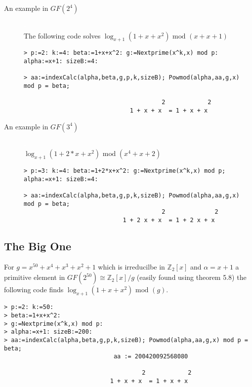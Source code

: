 \documentclass[article,oneside]{memoir}
\newcommand{\blank}{\textcolor{white}{-}}
\begin{document}
\begin{description}
\item[An example in $GF(2^4)$]  \blank \\
The following code solves
$\log_{x+1} (1+x+x^2) \textrm{ mod } ( x  + x + 1)$
\begin{verbatim}
> p:=2: k:=4: beta:=1+x+x^2: g:=Nextprime(x^k,x) mod p: alpha:=x+1: sizeB:=4:

> aa:=indexCalc(alpha,beta,g,p,k,sizeB); Powmod(alpha,aa,g,x) mod p = beta;

                                       2            2
                              1 + x + x  = 1 + x + x
\end{verbatim}

\item[An example in $GF(3^4)$]  \blank \\
$\log_{x+1} (1+2*x+x^2) \textrm{ mod } (x^4 + x + 2)$
\begin{verbatim}
> p:=3: k:=4: beta:=1+2*x+x^2: g:=Nextprime(x^k,x) mod p; alpha:=x+1: sizeB:=4:

> aa:=indexCalc(alpha,beta,g,p,k,sizeB); Powmod(alpha,aa,g,x) mod p = beta;
                                       2              2
                            1 + 2 x + x  = 1 + 2 x + x
\end{verbatim}
\end{description}

\subsection*{The Big One}
For $g=x^{50} +x^4+x^3+x^2+1$ which is irreducilbe in $\mathbb{Z}_2[x]$ and $\alpha = x+1$ a primitive element in $GF(2^{50}) \cong \mathbb{Z}_2 [x] / g$ (easily found using theorem 5.8)  the following code finds $\log_{x+1} (1+x+x^2) \textrm{ mod } (g)$.

\begin{verbatim}
> p:=2: k:=50: 
> beta:=1+x+x^2: 
> g:=Nextprime(x^k,x) mod p: 
> alpha:=x+1: sizeB:=200:
> aa:=indexCalc(alpha,beta,g,p,k,sizeB); Powmod(alpha,aa,g,x) mod p = beta;
                               aa := 200420092568080

                                       2            2
                              1 + x + x  = 1 + x + x
\end{verbatim}
\end{document}
